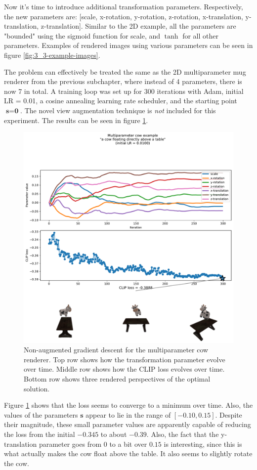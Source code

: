 Now it's time to introduce additional transformation parameters. Respectively, the new parameters are: [scale, x-rotation, y-rotation, z-rotation, x-translation, y-translation, z-translation]. Similar to the 2D example, all the parameters are "bounded" using the sigmoid function for scale, and $\tanh$ for all other parameters. Examples of rendered images using various parameters can be seen in figure \ref{fig:3_3-example-images}.

The problem can effectively be treated the same as the 2D multiparameter mug renderer from the previous subchapter, where instead of 4 parameters, there is now 7 in total. A training loop was set up for 300 iterations with Adam, initial LR = 0.01, a cosine annealing learning rate scheduler, and the starting point $\textbf{s} = \textbf{0}$. The novel view augmentation technique is \textit{not} included for this experiment. The results can be seen in figure \ref{fig:3_3-loss-graph}.
\begin{figure}[H]
    \centering
    \includegraphics[width=1.0\textwidth]{figures/3_3-loss-graph.pdf}
    \caption{Non-augmented gradient descent for the multiparameter cow renderer. Top row shows how the transformation parameter evolve over time. Middle row shows how the CLIP loss evolves over time. Bottom row shows three rendered perspectives of the optimal solution.}
    \label{fig:3_3-loss-graph}
\end{figure}
Figure \ref{fig:3_3-loss-graph} shows that the loss seems to converge to a minimum over time. Also, the values of the parameters $\textbf{s}$ appear to lie in the range of $[-0.10, 0.15]$. Despite their magnitude, these small parameter values are apparently capable of reducing the loss from the initial $-0.345$ to about $-0.39$. Also, the fact that the y-translation parameter goes from $0$ to a bit over $0.15$ is interesting, since this is what actually makes the cow float above the table. It also seems to slightly rotate the cow.


